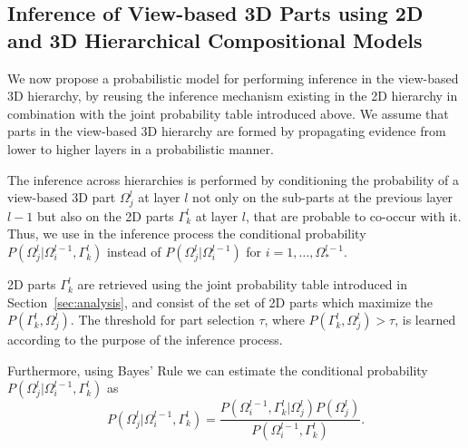 \documentclass[conference]{IEEEtran}
\begin{document}
\subsection{Inference of View-based 3D Parts using 2D and 3D Hierarchical Compositional Models}
\label{sec:inference}

We now propose a probabilistic model for performing inference in the view-based 3D hierarchy, by reusing the inference mechanism existing in the 2D hierarchy in combination with the joint probability table introduced above.
We assume that parts in the view-based 3D hierarchy are formed by propagating evidence from lower to higher layers in a probabilistic manner. 

The inference across hierarchies is performed by conditioning the probability of a view-based 3D part $\Omega_j^{l}$ at layer $l$ not only on the sub-parts at the previous layer $l-1$ but also on the 2D parts $\Gamma_k^l$ at layer $l$, that are probable to co-occur with it. Thus, we use in the inference process the conditional probability $P(\Omega_j^{l} \vert \Omega_i^{l-1},\Gamma_k^l)$ instead of $P(\Omega_j^{l} \vert \Omega_i^{l-1})$ for $i=1,\dots,\Omega_*^{l-1}$.

2D parts $\Gamma_k^l$ are retrieved using the joint probability table introduced in Section~\ref{sec:analysis}, and consist of the set of 2D parts which maximize the $P(\Gamma_k^l,\Omega_j^l)$. The threshold for part selection $\tau$, where $P(\Gamma_k^l,\Omega_j^l)>\tau$, is learned according to the purpose of the inference process.

Furthermore, using Bayes' Rule we can estimate the conditional probability $P(\Omega_j^{l} \vert \Omega_i^{l-1},\Gamma_k^l)$ as
\begin{equation}
  P(\Omega_j^{l} \vert \Omega_i^{l-1},\Gamma_k^l) = \frac{P(\Omega_i^{l-1},\Gamma_k^l \vert \Omega_j^{l})P(\Omega_j^{l})}{P(\Omega_i^{l-1},\Gamma_k^l)}.
  \label{eqn:POOG.Bayes}
\end{equation}
\end{document}
